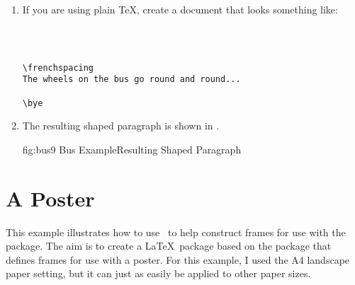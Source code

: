 \begin{enumerate}
\item If you are using plain \TeX, create a document that looks
something like:
\begin{verbatim}



\frenchspacing
The wheels on the bus go round and round...

\bye
\end{verbatim}

\item The resulting shaped paragraph is shown in .

\FloatFig
  {fig:bus9}
  {}
  {Bus Example\dash Resulting Shaped Paragraph}

\end{enumerate}

\section{A Poster}\label{sec:postertutorial}

This example illustrates how to use \FlowframTk\ to help construct
frames for use with the  package.
The aim is to create a \LaTeX\ package based on the
 package that defines frames for use with a
poster. For this example, I used the A4 landscape paper setting,
but it can just as easily be applied to other paper sizes.

